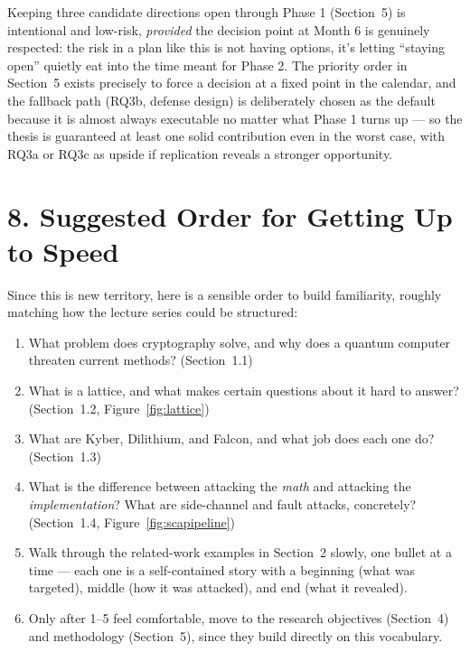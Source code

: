 \documentclass[11pt,a4paper]{article}
\begin{document}
Keeping three candidate directions open through Phase 1 (Section~5) is intentional and low-risk, \emph{provided} the decision point at Month 6 is genuinely respected: the risk in a plan like this is not having options, it's letting ``staying open'' quietly eat into the time meant for Phase 2. The priority order in Section~5 exists precisely to force a decision at a fixed point in the calendar, and the fallback path (RQ3b, defense design) is deliberately chosen as the default because it is almost always executable no matter what Phase 1 turns up --- so the thesis is guaranteed at least one solid contribution even in the worst case, with RQ3a or RQ3c as upside if replication reveals a stronger opportunity.

\section*{8. Suggested Order for Getting Up to Speed}

Since this is new territory, here is a sensible order to build familiarity, roughly matching how the lecture series could be structured:
\begin{enumerate}[leftmargin=*]
  \item What problem does cryptography solve, and why does a quantum computer threaten current methods? (Section~1.1)
  \item What is a lattice, and what makes certain questions about it hard to answer? (Section~1.2, Figure~\ref{fig:lattice})
  \item What are Kyber, Dilithium, and Falcon, and what job does each one do? (Section~1.3)
  \item What is the difference between attacking the \emph{math} and attacking the \emph{implementation}? What are side-channel and fault attacks, concretely? (Section~1.4, Figure~\ref{fig:scapipeline})
  \item Walk through the related-work examples in Section~2 slowly, one bullet at a time --- each one is a self-contained story with a beginning (what was targeted), middle (how it was attacked), and end (what it revealed).
  \item Only after 1--5 feel comfortable, move to the research objectives (Section~4) and methodology (Section~5), since they build directly on this vocabulary.
\end{enumerate}
\end{document}
